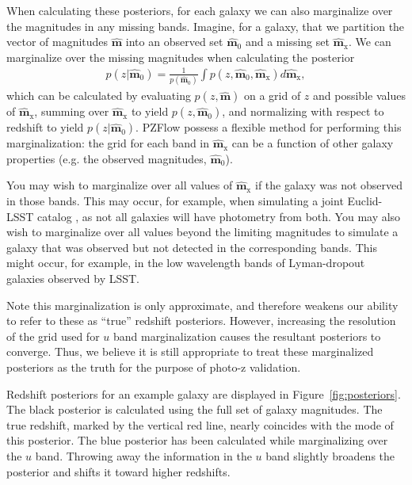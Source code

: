 \documentclass[twocolumn,twocolappendix]{aastex631}
\begin{document}
When calculating these posteriors, for each galaxy we can also marginalize over the magnitudes in any missing bands.
Imagine, for a galaxy, that we partition the vector of magnitudes $\mathbf{\hat{m}}$ into an observed set $\mathbf{\hat{m}}_0$ and a missing set $\mathbf{\hat{m}}_\text{x}$.
We can marginalize over the missing magnitudes when calculating the posterior
\begin{align}
    p(z|\mathbf{\hat{m}}_0) = \frac{1}{p(\mathbf{\hat{m}}_0)} \int p(z, \mathbf{\hat{m}}_0, \mathbf{\hat{m}}_\text{x}) d\mathbf{\hat{m}}_\text{x},
\end{align}
which can be calculated by evaluating $p(z, \mathbf{\hat{m}})$ on a grid of $z$ and possible values of $\mathbf{\hat{m}}_\text{x}$, summing over $\mathbf{\hat{m}}_\text{x}$ to yield $p(z, \mathbf{\hat{m}}_0)$, and normalizing with respect to redshift to yield $p(z|\mathbf{\hat{m}}_0)$.
PZFlow possess a flexible method for performing this marginalization: the grid for each band in $\mathbf{\hat{m}}_\text{x}$ can be a function of other galaxy properties (e.g. the observed magnitudes, $\mathbf{\hat{m}}_0$).

You may wish to marginalize over all values of $\mathbf{\hat{m}}_\text{x}$ if the galaxy was not observed in those bands.
This may occur, for example, when simulating a joint Euclid-LSST catalog \citep{euclid}, as not all galaxies will have photometry from both.
You may also wish to marginalize over all values beyond the limiting magnitudes to simulate a galaxy that was observed but not detected in the corresponding bands.
This might occur, for example, in the low wavelength bands of Lyman-dropout galaxies observed by LSST.

Note this marginalization is only approximate, and therefore weakens our ability to refer to these as ``true'' redshift posteriors.
However, increasing the resolution of the grid used for $u$ band marginalization causes the resultant posteriors to converge.
Thus, we believe it is still appropriate to treat these marginalized posteriors as the truth for the purpose of photo-z validation.

Redshift posteriors for an example galaxy are displayed in Figure~\ref{fig:posteriors}.
The black posterior is calculated using the full set of galaxy magnitudes.
The true redshift, marked by the vertical red line, nearly coincides with the mode of this posterior.
The blue posterior has been calculated while marginalizing over the $u$ band.
Throwing away the information in the $u$ band slightly broadens the posterior and shifts it toward higher redshifts.
\end{document}
